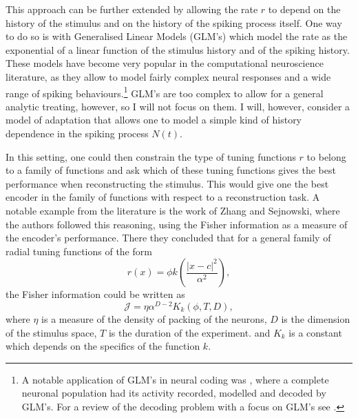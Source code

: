 This approach can be further extended by allowing the rate $r$ to depend on the history of the stimulus and on the history of the spiking process itself. One way to
do so is with Generalised Linear Models (GLM's) which model the rate as the exponential of a linear function of the stimulus history and of the spiking history. These
models have become very popular in the computational neuroscience literature, as they allow to model fairly complex neural responses and a wide range of spiking 
behaviours.\footnote{A notable application of GLM's in neural coding was , where a complete neuronal
population had its activity recorded, modelled and decoded by GLM's. For a review of the decoding problem with a focus on GLM's see 
.} GLM's are too complex to allow for a general analytic treating, however, so I will not focus on them. I will, however, consider a model
of adaptation that allows one to model a simple kind of history dependence in the spiking process $N(t)$.
\par

In this setting, one could then constrain the type of tuning
functions $r$ to belong to a family of functions and ask which of these tuning functions gives the best performance when reconstructing the stimulus.
This would give one the best encoder in the family of functions with respect to a reconstruction task. A notable example from the literature is the work of Zhang and Sejnowski, where the authors followed this reasoning, using the Fisher information as a measure of the encoder's performance. There they concluded
that for a general family of radial tuning functions of the form
\[
r(x) = \phi k\left(\frac{|x-c|^2}{\alpha^2}\right),
\]
the Fisher information could be written as
\[
\mathcal{J} = \eta \alpha^{D-2} K_k(\phi,T,D),
\]
where $\eta$ is a measure of the density of packing of the neurons, $D$ is the dimension of the stimulus space, $T$ is the duration of the experiment. and $K_k$ is a
constant which depends on the specifics of the function $k$.\par

